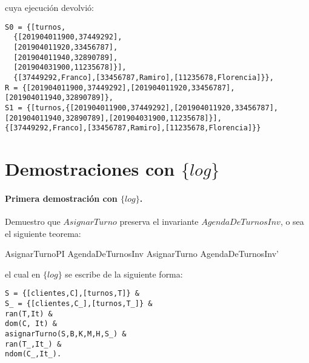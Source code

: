 \documentclass[%
  fleqn,colorlinks,linkcolor=blue,citecolor=blue,urlcolor=blue]{eptcs}
\newcommand{\setlog}{$\{log\}$\xspace}
\begin{document}
cuya ejecuci\'on devolvi\'o:

\begin{verbatim}
S0 = {[turnos,
  {[201904011900,37449292],
  [201904011920,33456787],
  [201904011940,32890789],
  [201904031900,11235678]}],
  {[37449292,Franco],[33456787,Ramiro],[11235678,Florencia]}},
R = {[201904011900,37449292],[201904011920,33456787],[201904011940,32890789]},
S1 = {[turnos,{[201904011900,37449292],[201904011920,33456787],
[201904011940,32890789],[201904031900,11235678]}],
{[37449292,Franco],[33456787,Ramiro],[11235678,Florencia]}}
\end{verbatim}

\section{Demostraciones con \setlog}

\paragraph{Primera demostraci\'on con \setlog.}

Demuestro que $AsignarTurno$ preserva el invariante $AgendaDeTurnosInv$, o sea el siguiente teorema:
\begin{theorem}{AsignarTurnoPI}
AgendaDeTurnosInv \land AsignarTurno \implies AgendaDeTurnosInv'
\end{theorem}
el cual en \setlog se escribe de la siguiente forma:
\begin{verbatim}
S = {[clientes,C],[turnos,T]} &
S_ = {[clientes,C_],[turnos,T_]} &
ran(T,It) &
dom(C, It) &
asignarTurno(S,B,K,M,H,S_) &
ran(T_,It_) &
ndom(C_,It_).
\end{verbatim}
\end{document}
